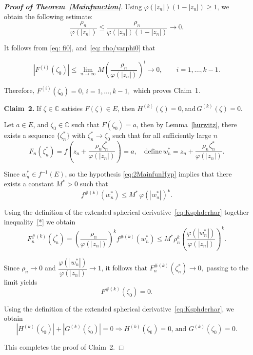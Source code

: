 \documentclass[10pt,a4paper]{amsart}
\numberwithin{equation}{section}
\begin{document}
\begin{proof}[\bf{Proof of Theorem~\ref{Mainfunction}}]
Using $\varphi(|z_n|)(1-|z_n|)\geq1$, we obtain the following estimate:
\begin{equation}\label{eq: rho/varphi0}
  \frac{\rho_n}{\varphi(|z_n|)}\leq\frac{\rho_n}
{\varphi(|z_n|)(1-|z_n|)}\longrightarrow 0.
\end{equation}

It follows from \eqref{eq: fi0}, and~\eqref{eq: rho/varphi0} that

\[
|F^{(i)}(\zeta_0)|
\leq
\lim_{n\to\infty}
M
\left(
\frac{\rho_n}{\varphi(|z_n|)}
\right)^i \longrightarrow 0,
\qquad
i=1,\ldots,k-1.
\]

Therefore, $
F^{(i)}(\zeta_0)=0,
\,
i=1,\ldots,k-1,
$
which proves Claim~1.
\smallskip

\noindent
\textbf{Claim~2.}
If $\zeta \in \mathbb{C}$ satisies $F(\zeta)\in E$, then
$
H^{(k)}(\zeta)=0,
\text{and}\,
G^{(k)}(\zeta)=0.
$\smallskip

Let $a\in E$, and $\zeta_{0}\in \mathbb{C}$ such that
$F(\zeta_{0})=a$,
then by Lemma~\ref{hurwitz}, there exists a 
sequence $\{\zeta_n^*\}$ with
$\zeta_n^*\to\zeta_0$ such that for all sufficiently large $n$
\[
F_n(\zeta_n^*)
=
f\!\left(
z_n+\frac{\rho_n\zeta_n^*}{\varphi(|z_n|)}
\right)
=a, \quad \text{define}\, w_n^*
=
z_n+\frac{\rho_n\zeta_n^*}{\varphi(|z_n|)}.
\]

Since $w_n^*\in f^{-1}(E)$, so the hypothesis \eqref{eq:2MainfunHyp}
 implies that there exists
a constant $M^*>0$ such that
\begin{equation}\label{*}
  f^{\#(k)}(w_n^*)
\leq
M^*\,\varphi(|w_n^*|)^k.
\end{equation}

Using the definition of the extended spherical
 derivative~\eqref{eq:Ksphderhar} together inequality~\eqref{*}
we obtain
\[
F_n^{\#(k)}(\zeta_n^*)
=
\left(\frac{\rho_n}{\varphi(|z_n|)}\right)^k
f^{\#(k)}(w_n^*)\leq
M^*\rho_n^k
\left(
\frac{\varphi(|w_n^*|)}
{\varphi(|z_n|)}
\right)^k.
\]

Since $\rho_n\to0$ and
$\dfrac{\varphi(|w_n^*|)}{\varphi(|z_n|)}
\longrightarrow1$, it follows that
$
F_n^{\#(k)}(\zeta_n^*)\longrightarrow 0,
$ passing to the limit yields
\[
F^{\#(k)}(\zeta_0)=0.
\]

Using the definition of the extended spherical 
derivative~\eqref{eq:Ksphderhar},
we obtain
\[
|H^{(k)}(\zeta_0)|+|G^{(k)}(\zeta_0)|=0 \Longrightarrow H^{(k)}(\zeta_0)=0,
\, \text{and}\,\,
G^{(k)}(\zeta_0)=0.
\]

This completes the proof of Claim~2.
\smallskip


\end{proof}
\end{document}
